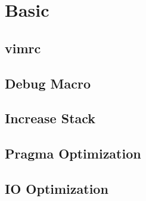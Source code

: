 \documentclass[a4paper,10pt,twocolumn,oneside]{article}
\begin{document}
\pagestyle{fancy}
\fancyfoot{}
\fancyhead[R]{\thepage}
\renewcommand{\headrulewidth}{0.4pt}
\renewcommand{\contentsname}{Contents} 

\scriptsize
\vspace{-2em}
\tableofcontents
\vspace{-1em}



\newcommand{\includecode}[3][C++]{
  \subsection{#2}
  \vspace{-0.8em}
  
  \vspace{-1.2em}
}

\newcommand{\includecodewithhash}[3][C++]{
    \includecode[#1]{#2
        \mbox{}\hfill
        \immediate\write18{./hash.sh "#3"}
        \immediate\protect
    }{#3}
}

\newcommand{\includetex}[2]{
  \subsection{#1}
  
  \vspace{-1.2em}
}

\newcommand{\sectiontitle}[1]{
  \section{#1}
  \vspace{-0.5em}
}



\sectiontitle{Basic}

\includecode[{}]{vimrc}{../codes/Basic/vimrc}
\includecode{Debug Macro}{../codes/Basic/debug.cpp}
\includecode{Increase Stack}{../codes/Basic/IncStack.cpp}
\includecode{Pragma Optimization}{../codes/Basic/Pragma.cpp}
% 
% 
\includecode{IO Optimization}{../codes/Basic/IOOptimize.cpp}
\end{document}
